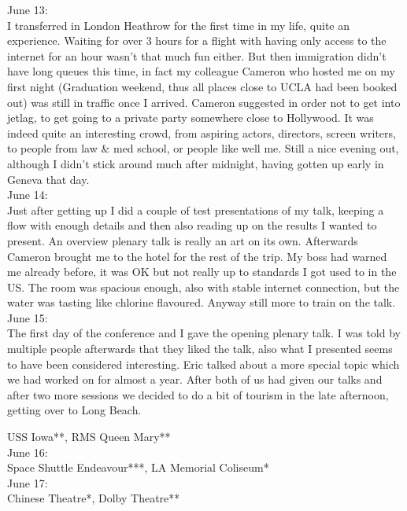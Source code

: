 June 13:\\
I transferred in London Heathrow for the first time in my life, quite an experience. Waiting for over 3 hours for a flight with having only access to the internet for an hour wasn't that much fun either. But then immigration didn't have long queues this time, in fact my colleague Cameron who hosted me on my first night (Graduation weekend, thus all places close to UCLA had been booked out) was still in traffic once I arrived. Cameron suggested in order not to get into jetlag, to get going to a private party somewhere close to Hollywood. It was indeed quite an interesting crowd, from aspiring actors, directors, screen writers, to people from law \& med school, or people like well me. Still a nice evening out, although I didn't stick around much after midnight, having gotten up early in Geneva that day.\\

June 14:\\
Just after getting up I did a couple of test presentations of my talk, keeping a flow with enough details and then also reading up on the results I wanted to present. An overview plenary talk is really an art on its own. Afterwards Cameron brought me to the hotel for the rest of the trip. My boss had warned me already before, it was OK but not really up to standards I got used to in the US. The room was spacious enough, also with stable internet connection, but the water was tasting like chlorine flavoured. Anyway still more to train on the talk.\\

June 15:\\
The first day of the conference and I gave the opening plenary talk. I was told by multiple people afterwards that they liked the talk, also what I presented seems to have been considered interesting. Eric talked about a more special topic which we had worked on for almost a year. After both of us had given our talks and after two more sessions we decided to do a bit of tourism in the late afternoon, getting over to Long Beach.

USS Iowa**, RMS Queen Mary**\\

June 16:\\
Space Shuttle Endeavour***, LA Memorial Coliseum*\\

June 17:\\
Chinese Theatre*, Dolby Theatre**\\


